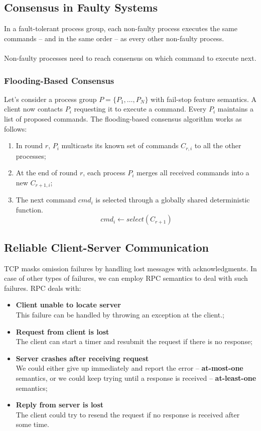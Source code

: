 \documentclass{article}
\begin{document}
\subsection{Consensus in Faulty Systems}
In a fault-tolerant process group, each non-faulty process executes the same commands -- and in the same order -- as every other non-faulty process. \\ \\
Non-faulty processes need to reach consensus on which command to execute next.

\subsubsection{Flooding-Based Consensus}
Let's consider a process group $P = \{ P_1, \dots, P_N \}$ with fail-stop feature semantics. A client now contacts $P_i$ requesting it to execute a command. Every $P_i$ maintains a list of proposed commands. The flooding-based consensus algorithm works as follows:
\begin{enumerate}
	\item In round $r$, $P_i$ multicasts its known set of commands $C_{r, i}$ to all the other processes;
	\item At the end of round $r$, each process $P_i$ merges all received commands into a new $C_{r+1, i}$;
	\item The next command $cmd_i$ is selected through a globally shared deterministic function.
	\[ cmd_i \leftarrow select(C_{r+1}) \]
\end{enumerate}

\subsection{Reliable Client-Server Communication}
TCP masks omission failures by handling lost messages with acknowledgments. In case of other types of failures, we can employ RPC semantics to deal with such failures. RPC deals with:
\begin{itemize}
	\item \textbf{Client unable to locate server} \\
	This failure can be handled by throwing an exception at the client.;
	\item \textbf{Request from client is lost} \\
	The client can start a timer and resubmit the request if there is no response;
	\item \textbf{Server crashes after receiving request} \\
	We could either give up immediately and report the error -- \textbf{at-most-one} semantics, or we could keep trying until a response is received -- \textbf{at-least-one} semantics;
	\item \textbf{Reply from server is lost} \\
	The client could try to resend the request if no response is received after some time.
\end{itemize}
\end{document}
